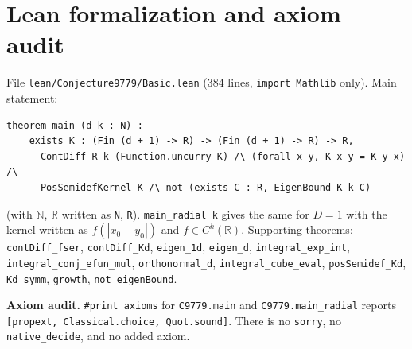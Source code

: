 \documentclass[11pt]{article}
\theoremstyle{definition}
\theoremstyle{remark}
\begin{document}
\section{Lean formalization and axiom audit}

File \texttt{lean/Conjecture9779/Basic.lean} (384 lines, \texttt{import Mathlib} only). Main
statement:
\begin{verbatim}
theorem main (d k : N) :
    exists K : (Fin (d + 1) -> R) -> (Fin (d + 1) -> R) -> R,
      ContDiff R k (Function.uncurry K) /\ (forall x y, K x y = K y x) /\
      PosSemidefKernel K /\ not (exists C : R, EigenBound K k C)
\end{verbatim}
(with $\mathbb N$, $\mathbb R$ written as \texttt{N}, \texttt{R}). \texttt{main\_radial k} gives the
same for $D=1$ with the kernel written as $f(|x_0-y_0|)$ and $f\in C^k(\mathbb R)$. Supporting
theorems: \texttt{contDiff\_fser}, \texttt{contDiff\_Kd}, \texttt{eigen\_1d}, \texttt{eigen\_d},
\texttt{integral\_exp\_int}, \texttt{integral\_conj\_efun\_mul}, \texttt{orthonormal\_d},
\texttt{integral\_cube\_eval}, \texttt{posSemidef\_Kd}, \texttt{Kd\_symm}, \texttt{growth},
\texttt{not\_eigenBound}.

\textbf{Axiom audit.} \texttt{\#print axioms} for \texttt{C9779.main} and \texttt{C9779.main\_radial}
reports \texttt{[propext, Classical.choice, Quot.sound]}. There is no \texttt{sorry}, no
\texttt{native\_decide}, and no added axiom.
\end{document}

